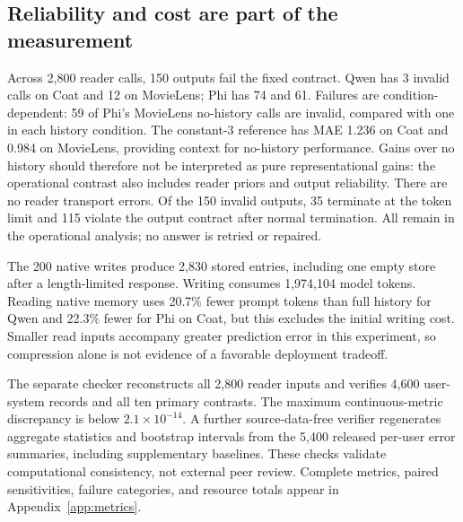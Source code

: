 \subsection{Reliability and cost are part of the measurement}
Across 2,800 reader calls, 150 outputs fail the fixed contract. Qwen has 3 invalid calls on Coat and 12 on MovieLens; Phi has 74 and 61. Failures are condition-dependent: 59 of Phi's MovieLens no-history calls are invalid, compared with one in each history condition. The constant-3 reference has MAE 1.236 on Coat and 0.984 on MovieLens, providing context for no-history performance. Gains over no history should therefore not be interpreted as pure representational gains: the operational contrast also includes reader priors and output reliability. There are no reader transport errors. Of the 150 invalid outputs, 35 terminate at the token limit and 115 violate the output contract after normal termination. All remain in the operational analysis; no answer is retried or repaired.

The 200 native writes produce 2,830 stored entries, including one empty store after a length-limited response. Writing consumes 1,974,104 model tokens. Reading native memory uses 20.7\% fewer prompt tokens than full history for Qwen and 22.3\% fewer for Phi on Coat, but this excludes the initial writing cost. Smaller read inputs accompany greater prediction error in this experiment, so compression alone is not evidence of a favorable deployment tradeoff.

The separate checker reconstructs all 2,800 reader inputs and verifies 4,600 user-system records and all ten primary contrasts. The maximum continuous-metric discrepancy is below $2.1\times10^{-14}$. A further source-data-free verifier regenerates aggregate statistics and bootstrap intervals from the 5,400 released per-user error summaries, including supplementary baselines. These checks validate computational consistency, not external peer review. Complete metrics, paired sensitivities, failure categories, and resource totals appear in Appendix~\ref{app:metrics}.
